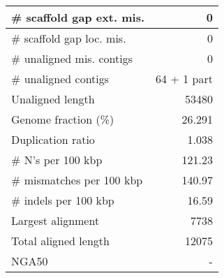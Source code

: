 \documentclass[12pt,a4paper]{article}
\begin{document}
\begin{table}[ht]
\begin{center}
\begin{tabular}{|l*{1}{|r}|}
\# scaffold gap ext. mis. & 0 \\ \hline
\# scaffold gap loc. mis. & 0 \\ \hline
\# unaligned mis. contigs & 0 \\ \hline
\# unaligned contigs & 64 + 1 part \\ \hline
Unaligned length & 53480 \\ \hline
Genome fraction (\%) & 26.291 \\ \hline
Duplication ratio & 1.038 \\ \hline
\# N's per 100 kbp & 121.23 \\ \hline
\# mismatches per 100 kbp & 140.97 \\ \hline
\# indels per 100 kbp & 16.59 \\ \hline
Largest alignment & 7738 \\ \hline
Total aligned length & 12075 \\ \hline
NGA50 & - \\ \hline
\end{tabular}
\end{center}
\end{table}
\end{document}
